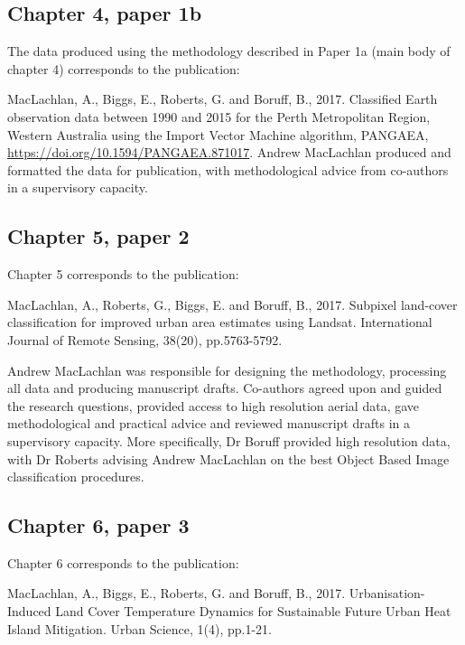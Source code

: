 \documentclass[]{book}
\begin{document}
\subsection*{Chapter 4, paper 1b}\label{chapter-4-paper-1b}

The data produced using the methodology described in Paper 1a (main body
of chapter 4) corresponds to the publication:

MacLachlan, A., Biggs, E., Roberts, G. and Boruff, B., 2017. Classified
Earth observation data between 1990 and 2015 for the Perth Metropolitan
Region, Western Australia using the Import Vector Machine algorithm,
PANGAEA, \url{https://doi.org/10.1594/PANGAEA.871017}. Andrew MacLachlan
produced and formatted the data for publication, with methodological
advice from co-authors in a supervisory capacity.

\subsection*{Chapter 5, paper 2}\label{chapter-5-paper-2}

Chapter 5 corresponds to the publication:

MacLachlan, A., Roberts, G., Biggs, E. and Boruff, B., 2017. Subpixel
land-cover classification for improved urban area estimates using
Landsat. International Journal of Remote Sensing, 38(20), pp.5763-5792.

Andrew MacLachlan was responsible for designing the methodology,
processing all data and producing manuscript drafts. Co-authors agreed
upon and guided the research questions, provided access to high
resolution aerial data, gave methodological and practical advice and
reviewed manuscript drafts in a supervisory capacity. More specifically,
Dr Boruff provided high resolution data, with Dr Roberts advising Andrew
MacLachlan on the best Object Based Image classification procedures.

\subsection*{Chapter 6, paper 3}\label{chapter-6-paper-3}

Chapter 6 corresponds to the publication:

MacLachlan, A., Biggs, E., Roberts, G. and Boruff, B., 2017.
Urbanisation-Induced Land Cover Temperature Dynamics for Sustainable
Future Urban Heat Island Mitigation. Urban Science, 1(4), pp.1-21.
\end{document}
